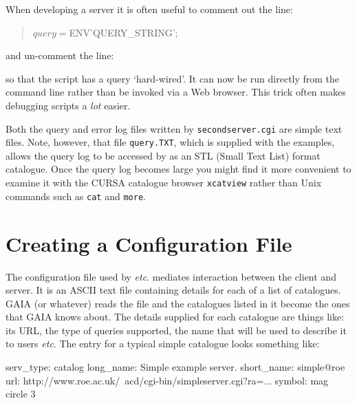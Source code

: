 \documentclass[twoside,11pt,nolof,chapters]{starlink}
\begin{document}
When developing a server it is often useful to comment out the line:

\begin{quote}
\begin{terminalv}
     $query = $ENV{'QUERY_STRING'};
\end{terminalv}
\end{quote}

and un-comment the line:

\begin{quote}
\end{quote}

so that the script has a query `hard-wired'.  It can now be run directly
from the command line rather than be invoked via a Web browser.  This
trick often makes debugging scripts a \textit{lot}\/ easier.

Both the query and error log files written by \texttt{secondserver.cgi}
are simple text files.  Note, however, that file \texttt{query.TXT}, which
is supplied with the examples, allows the query log to be accessed by
\cite{SUN190} as an STL (Small Text List) format
catalogue.  Once the query log becomes large you might find it more
convenient to examine it with the CURSA catalogue browser \texttt{xcatview}
rather than Unix commands such as \texttt{cat} and \texttt{more}.


\section{\label{CONFIG_T}Creating a Configuration File}

The configuration file used by  \emph{etc}. mediates
interaction between the client and server.  It is an ASCII text file
containing details for each of a list of catalogues.  GAIA (or whatever)
reads the file and the catalogues listed in it become the ones that GAIA
knows about.  The details supplied for each catalogue are things like:
its URL, the type of queries supported, the name that will be used to
describe it to users \emph{etc}.  The entry for a typical simple catalogue
looks something like:

\begin{terminalv}
serv_type:      catalog
long_name:      Simple example server.
short_name:     simple@roe
url:            http://www.roe.ac.uk/~acd/cgi-bin/simpleserver.cgi?ra=...
symbol:         mag circle 3
\end{terminalv}
\end{document}
